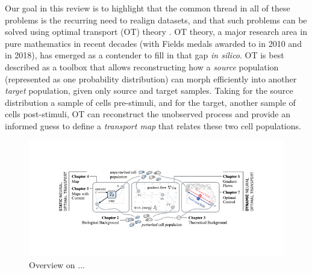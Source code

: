 Our goal in this review is to highlight that the common thread in all of these problems is the recurring need to realign datasets, and that such problems can be solved using optimal transport (OT) theory \citep{villani2021topics, santambrogio2015optimal}.
OT theory, a major research area in pure mathematics in recent decades (with Fields medals awarded to \citeauthor{villani2021topics} in 2010 and \citeauthor{figalli2017monge} in 2018), has emerged as a contender to fill in that gap \textit{in silico}. OT is best described as a toolbox that allows reconstructing how a \emph{source} population (represented as one probability distribution) can morph efficiently into another \emph{target} population, given only source and target samples. Taking for the source distribution a sample of cells pre-stimuli, and for the target, another sample of cells post-stimuli, OT can reconstruct the unobserved process and provide an informed guess to define a \emph{transport map} that relates these two cell populations. 

\begin{figure}[t]
  \includegraphics[width=\textwidth]{figures/fig_overview_thesis.pdf}
  \caption{Overview on ...}
\end{figure}


